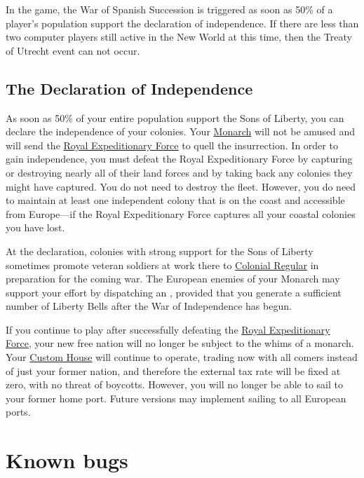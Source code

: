 \documentclass[12pt]{book}
\begin{document}
In the game, the War of Spanish Succession is triggered as soon as
50\% of a player's population support the declaration of independence.
If there are less than two computer players still active in the New
World at this time, then the Treaty of Utrecht event can not occur.


\hypertarget{Declaration of Independence}{\section{The Declaration
of Independence}}

As soon as 50\% of your entire population support the Sons of Liberty,
you can declare the independence of your colonies.  Your
\hyperlink{Monarch}{Monarch} will not be amused and will send the
\hyperlink{Royal Expeditionary Force}{Royal Expeditionary Force} to
quell the insurrection. In order to gain independence, you must defeat
the Royal Expeditionary Force by capturing or destroying nearly all of
their land forces and by taking back any colonies they might have
captured. You do not need to destroy the fleet.  However, you do need
to maintain at least one independent colony that is on the coast and
accessible from Europe---if the Royal Expeditionary Force captures
all your coastal colonies you have lost.

At the declaration, colonies with strong support for the Sons of
Liberty sometimes promote veteran soldiers at work there to
\hyperlink{Colonial Regular}{Colonial Regular} in preparation for the
coming war. The European enemies of your Monarch may support your
effort by dispatching an , provided that
you generate a sufficient number of Liberty Bells after the War of
Independence has begun.

If you continue to play after successfully defeating the
\hyperlink{Royal Expeditionary Force}{Royal Expeditionary Force}, your
new free nation will no longer be subject to the whims of a monarch.
Your \hyperlink{Custom House}{Custom House} will continue to operate,
trading now with all comers instead of just your former nation, and
therefore the external tax rate will be fixed at zero, with no threat of
boycotts.  However, you will no longer be able to sail to your former
home port.  Future versions may implement sailing to all European ports.



\hypertarget{Known bugs}{\chapter{Known bugs}}
\end{document}
